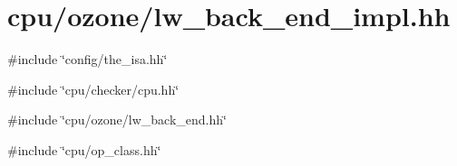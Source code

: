 \hypertarget{lw__back__end__impl_8hh}{
\section{cpu/ozone/lw\_\-back\_\-end\_\-impl.hh}
\label{lw__back__end__impl_8hh}
}
{\ttfamily \#include \char`\"{}config/the\_\-isa.hh\char`\"{}}\par
{\ttfamily \#include \char`\"{}cpu/checker/cpu.hh\char`\"{}}\par
{\ttfamily \#include \char`\"{}cpu/ozone/lw\_\-back\_\-end.hh\char`\"{}}\par
{\ttfamily \#include \char`\"{}cpu/op\_\-class.hh\char`\"{}}\par
